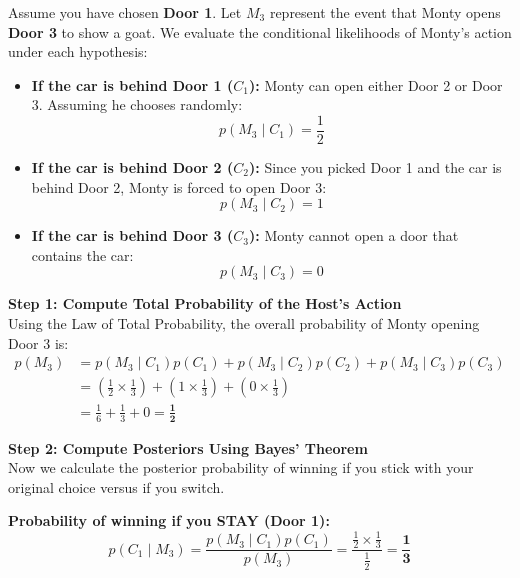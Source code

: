 \documentclass{article}
\begin{document}
\noindent Assume you have chosen \textbf{Door 1}. Let $M_3$ represent the event that Monty opens \textbf{Door 3} to show a goat. We evaluate the conditional likelihoods of Monty's action under each hypothesis:
\begin{itemize}
    \item \textbf{If the car is behind Door 1 ($C_1$):} Monty can open either Door 2 or Door 3. Assuming he chooses randomly:
    \begin{equation}
        p(M_3 \mid C_1) = \frac{1}{2}
    \end{equation}
    \item \textbf{If the car is behind Door 2 ($C_2$):} Since you picked Door 1 and the car is behind Door 2, Monty is forced to open Door 3:
    \begin{equation}
        p(M_3 \mid C_2) = 1
    \end{equation}
    \item \textbf{If the car is behind Door 3 ($C_3$):} Monty cannot open a door that contains the car:
    \begin{equation}
        p(M_3 \mid C_3) = 0
    \end{equation}
\end{itemize}

\vspace{0.2cm}
\noindent \textbf{Step 1: Compute Total Probability of the Host's Action} \\
Using the Law of Total Probability, the overall probability of Monty opening Door 3 is:
\begin{align}
    p(M_3) &= p(M_3 \mid C_1)p(C_1) + p(M_3 \mid C_2)p(C_2) + p(M_3 \mid C_3)p(C_3) \\
    &= \left(\frac{1}{2} \times \frac{1}{3}\right) + \left(1 \times \frac{1}{3}\right) + \left(0 \times \frac{1}{3}\right) \\
    &= \frac{1}{6} + \frac{1}{3} + 0 = \mathbf{\frac{1}{2}}
\end{align}

\noindent \textbf{Step 2: Compute Posteriors Using Bayes' Theorem} \\
Now we calculate the posterior probability of winning if you stick with your original choice versus if you switch.

\noindent \textbf{Probability of winning if you STAY (Door 1):}
\begin{equation}
    p(C_1 \mid M_3) = \frac{p(M_3 \mid C_1)p(C_1)}{p(M_3)} = \frac{\frac{1}{2} \times \frac{1}{3}}{\frac{1}{2}} = \mathbf{\frac{1}{3}}
\end{equation}
\end{document}

